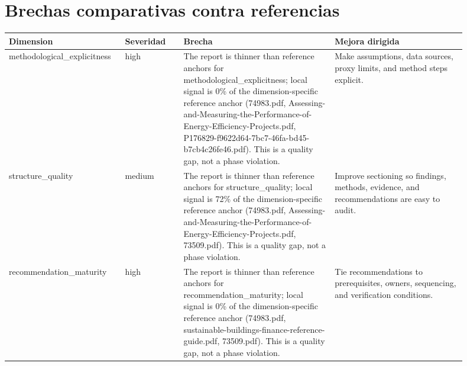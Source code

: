 \documentclass[11pt]{article}
\begin{document}
\section*{Brechas comparativas contra referencias}
\begin{longtable}{>{\raggedright\arraybackslash}p{0.2\linewidth}>{\raggedright\arraybackslash}p{0.12\linewidth}>{\raggedright\arraybackslash}p{0.31\linewidth}>{\raggedright\arraybackslash}p{0.27\linewidth}}
\textbf{Dimension} & \textbf{Severidad} & \textbf{Brecha} & \textbf{Mejora dirigida}\\ \hline
methodological\_explicitness & high & The report is thinner than reference anchors for methodological\_explicitness; local signal is 0\% of the dimension-specific reference anchor (74983.pdf, Assessing-and-Measuring-the-Performance-of-Energy-Efficiency-Projects.pdf, P176829-f9622d64-7bc7-46fa-bd45-b7cb4c26fe46.pdf). This is a quality gap, not a phase violation. & Make assumptions, data sources, proxy limits, and method steps explicit.\\
structure\_quality & medium & The report is thinner than reference anchors for structure\_quality; local signal is 72\% of the dimension-specific reference anchor (74983.pdf, Assessing-and-Measuring-the-Performance-of-Energy-Efficiency-Projects.pdf, 73509.pdf). This is a quality gap, not a phase violation. & Improve sectioning so findings, methods, evidence, and recommendations are easy to audit.\\
recommendation\_maturity & high & The report is thinner than reference anchors for recommendation\_maturity; local signal is 0\% of the dimension-specific reference anchor (74983.pdf, sustainable-buildings-finance-reference-guide.pdf, 73509.pdf). This is a quality gap, not a phase violation. & Tie recommendations to prerequisites, owners, sequencing, and verification conditions.\\
\end{longtable}
\end{document}
